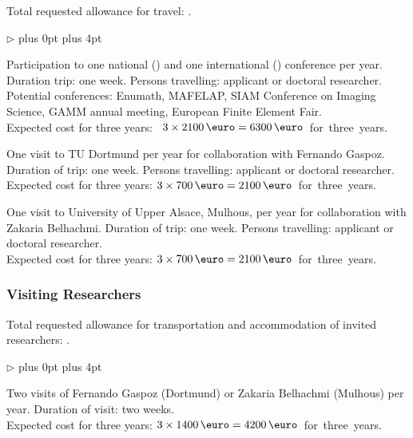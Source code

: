 \documentclass[enabledeprecatedfontcommands,cleardoublepage=empty,headsepline,twoside,11pt,DIV=15,BCOR=12mm,final]{scrartcl}
\renewenvironment{itemize}
{\begin{list}{$\triangleright$}{\labelwidth-2mm \leftmargin3mm %
  \itemsep5pt plus 0pt  \topsep3pt \parsep1pt plus 4pt \labelsep2mm}}
{\end{list}}
\begin{document}
Total requested allowance for travel: .
\begin{itemize}\itemsep=-1pt
\item Participation to one national () and one international () conference per year. Duration trip: one week. Persons travelling: applicant  or doctoral researcher. Potential conferences: Enumath, MAFELAP,  SIAM Conference on Imaging Science, GAMM annual meeting, European Finite Element Fair. \\
Expected cost for three years: \dotfill\hbox{ $3 \times 2100\,\text{\euro}=6300\,\text{\euro}$ for three years.}

  \item One visit to TU Dortmund per year for collaboration with Fernando Gaspoz.
Duration of trip: one week. Persons travelling: applicant or doctoral researcher.\\
 Expected cost for three years:  \dotfill\hbox{$3 \times 700\,\text{\euro}=2100\,\text{\euro}$ for three years.}
 
\item One visit to University of Upper Alsace, Mulhous, per year for collaboration with Zakaria Belhachmi. Duration of trip: one week. Persons travelling: applicant or doctoral researcher.\\
Expected cost for three years:  \dotfill\hbox{$3 \times 700\,\text{\euro}=2100\,\text{\euro}$ for three years.}
\end{itemize}

\subsubsection{Visiting Researchers}
Total requested allowance for transportation and accommodation of invited researchers: .
\begin{itemize}\itemsep=-1pt
\item Two visits of Fernando Gaspoz (Dortmund) or Zakaria Belhachmi (Mulhous) per year. Duration of visit: two weeks.\\
 Expected cost for three years:   \dotfill\hbox{$3 \times 1400\,\text{\euro}=4200\,\text{\euro}$ for three years.}
\end{itemize}

\end{document}
